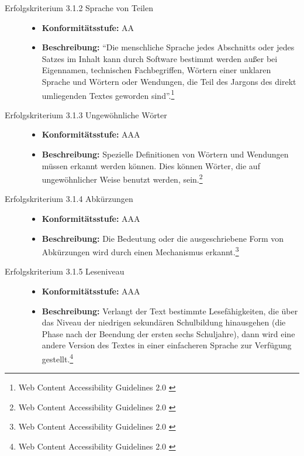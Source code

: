\begin{description}
\begin{description}
		\item[Erfolgskriterium 3.1.2 Sprache von Teilen]\hfill
		\begin{itemize}
			\item \textbf{Konformitätsstufe:} AA
			\item \textbf{Beschreibung:} "`Die menschliche Sprache jedes Abschnitts oder jedes Satzes im Inhalt kann durch Software bestimmt werden außer
			bei Eigennamen, technischen Fachbegriffen, Wörtern einer unklaren Sprache und Wörtern oder Wendungen, die Teil des Jargons des direkt 
			umliegenden Textes geworden sind"'.\footnote{Web Content Accessibility Guidelines 2.0 \cite{WCAG2.0}}
		\end{itemize}
		
		\item[Erfolgskriterium 3.1.3 Ungewöhnliche Wörter]\hfill
		\begin{itemize}
			\item \textbf{Konformitätsstufe:} AAA
			\item \textbf{Beschreibung:} Spezielle Definitionen von Wörtern und Wendungen müssen erkannt werden können. Dies können Wörter, die auf ungewöhnlicher 
			Weise benutzt werden, sein.\footnote{Web Content Accessibility Guidelines 2.0 \cite{WCAG2.0}}
		\end{itemize}
		
		\item[Erfolgskriterium 3.1.4 Abkürzungen]\hfill
		\begin{itemize}
			\item \textbf{Konformitätsstufe:} AAA
			\item \textbf{Beschreibung:} Die Bedeutung oder die ausgeschriebene Form von Abkürzungen wird durch einen Mechanismus 
			erkannt.\footnote{Web Content Accessibility Guidelines 2.0 \cite{WCAG2.0}}
		\end{itemize}
		
		\item[Erfolgskriterium 3.1.5 Leseniveau]\hfill
		\begin{itemize}
			\item \textbf{Konformitätsstufe:} AAA
			\item \textbf{Beschreibung:} Verlangt der Text bestimmte Lesefähigkeiten, die über das Niveau der niedrigen sekundären Schulbildung hinausgehen (die 
			Phase nach der Beendung der ersten sechs Schuljahre), dann wird eine andere Version des Textes in einer einfacheren Sprache zur Verfügung 
			gestellt.\footnote{Web Content Accessibility Guidelines 2.0 \cite{WCAG2.0}}
		\end{itemize}
		

\end{description}
\end{description}
